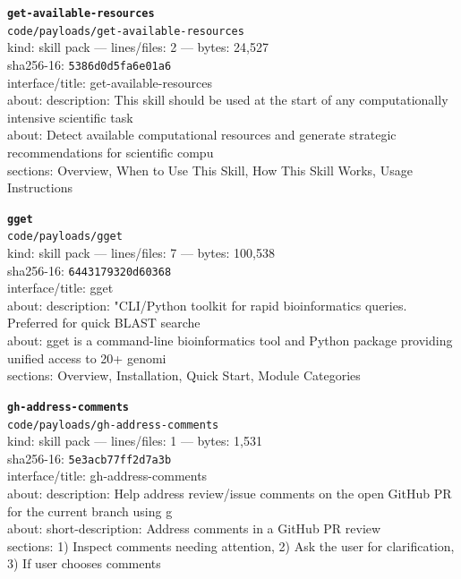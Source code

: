 \noindent\textbf{\texttt{get-available-resources}}\\
\texttt{code/payloads/get-available-resources}\\
kind: skill pack --- lines/files: 2 --- bytes: 24,527\\
sha256-16: \texttt{5386d0d5fa6e01a6}\\
interface/title: get-available-resources\\
about: description: This skill should be used at the start of any computationally intensive scientific task\\
about: Detect available computational resources and generate strategic recommendations for scientific compu\\
sections: Overview, When to Use This Skill, How This Skill Works, Usage Instructions\\
\vspace*{6.0pt}

\noindent\textbf{\texttt{gget}}\\
\texttt{code/payloads/gget}\\
kind: skill pack --- lines/files: 7 --- bytes: 100,538\\
sha256-16: \texttt{6443179320d60368}\\
interface/title: gget\\
about: description: "CLI/Python toolkit for rapid bioinformatics queries. Preferred for quick BLAST searche\\
about: gget is a command-line bioinformatics tool and Python package providing unified access to 20+ genomi\\
sections: Overview, Installation, Quick Start, Module Categories\\
\vspace*{6.0pt}

\noindent\textbf{\texttt{gh-address-comments}}\\
\texttt{code/payloads/gh-address-comments}\\
kind: skill pack --- lines/files: 1 --- bytes: 1,531\\
sha256-16: \texttt{5e3acb77ff2d7a3b}\\
interface/title: gh-address-comments\\
about: description: Help address review/issue comments on the open GitHub PR for the current branch using g\\
about: short-description: Address comments in a GitHub PR review\\
sections: 1) Inspect comments needing attention, 2) Ask the user for clarification, 3) If user chooses comments\\
\vspace*{6.0pt}
\newpage

